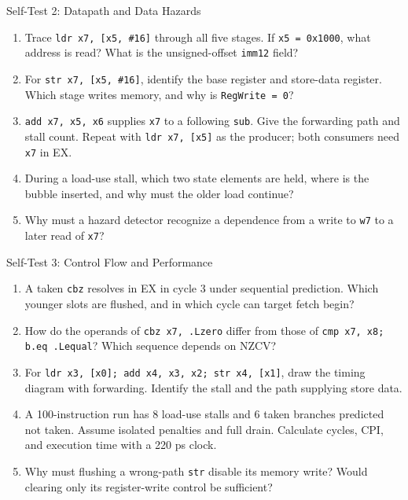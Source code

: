 \documentclass[aspectratio=169,11pt,t]{beamer}
\newcommand{\code}[1]{\texttt{#1}}
\begin{document}
\begin{frame}{Self-Test 2: Datapath and Data Hazards}

\begin{enumerate}\setlength{\itemsep}{8pt}
\item Trace \code{ldr x7, [x5, \#16]} through all five stages. If \code{x5 = 0x1000}, what address is read? What is the unsigned-offset \code{imm12} field?
\item For \code{str x7, [x5, \#16]}, identify the base register and store-data register. Which stage writes memory, and why is \code{RegWrite = 0}?
\item \code{add x7, x5, x6} supplies \code{x7} to a following \code{sub}. Give the forwarding path and stall count. Repeat with \code{ldr x7, [x5]} as the producer; both consumers need \code{x7} in EX.
\item During a load-use stall, which two state elements are held, where is the bubble inserted, and why must the older load continue?
\item Why must a hazard detector recognize a dependence from a write to \code{w7} to a later read of \code{x7}?
\end{enumerate}

\end{frame}

\begin{frame}{Self-Test 3: Control Flow and Performance}

\begin{enumerate}\setlength{\itemsep}{8pt}
\item A taken \code{cbz} resolves in EX in cycle 3 under sequential prediction. Which younger slots are flushed, and in which cycle can target fetch begin?
\item How do the operands of \code{cbz x7, .Lzero} differ from those of \code{cmp x7, x8; b.eq .Lequal}? Which sequence depends on NZCV?
\item For \code{ldr x3, [x0]; add x4, x3, x2; str x4, [x1]}, draw the timing diagram with forwarding. Identify the stall and the path supplying store data.
\item A 100-instruction run has 8 load-use stalls and 6 taken branches predicted not taken. Assume isolated penalties and full drain. Calculate cycles, CPI, and execution time with a 220 ps clock.
\item Why must flushing a wrong-path \code{str} disable its memory write? Would clearing only its register-write control be sufficient?
\end{enumerate}

\end{frame}
\end{document}
